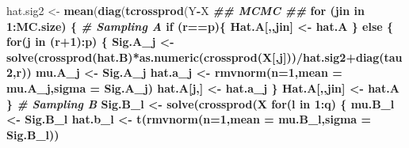 \documentclass[]{book}
\newenvironment{Shaded}{\begin{snugshade}}{\end{snugshade}}
\newcommand{\CommentTok}[1]{\textcolor[rgb]{0.56,0.35,0.01}{\textit{#1}}}
\newcommand{\ControlFlowTok}[1]{\textcolor[rgb]{0.13,0.29,0.53}{\textbf{#1}}}
\newcommand{\DataTypeTok}[1]{\textcolor[rgb]{0.13,0.29,0.53}{#1}}
\newcommand{\DecValTok}[1]{\textcolor[rgb]{0.00,0.00,0.81}{#1}}
\newcommand{\KeywordTok}[1]{\textcolor[rgb]{0.13,0.29,0.53}{\textbf{#1}}}
\newcommand{\NormalTok}[1]{#1}
\newcommand{\OperatorTok}[1]{\textcolor[rgb]{0.81,0.36,0.00}{\textbf{#1}}}
\newcommand{\StringTok}[1]{\textcolor[rgb]{0.31,0.60,0.02}{#1}}
\begin{document}
\begin{Shaded}
\begin{Highlighting}[]
{{\NormalTok{    hat.sig2 <-}\StringTok{ }\KeywordTok{mean}\NormalTok{(}\KeywordTok{diag}\NormalTok{(}\KeywordTok{tcrossprod}\NormalTok{(Y}\OperatorTok{-}\NormalTok{X}\OperatorTok{%*%}\NormalTok{hat.A}\OperatorTok{%*%}\KeywordTok{t}\NormalTok{(hat.B))))  }\CommentTok{#true.sig2}
    \CommentTok{## MCMC ##}
    \ControlFlowTok{for}\NormalTok{ (jin }\ControlFlowTok{in} \DecValTok{1}\OperatorTok{:}\NormalTok{MC.size) \{}
      \CommentTok{# Sampling A}
      \ControlFlowTok{if}\NormalTok{ (r}\OperatorTok{==}\NormalTok{p)\{}
\NormalTok{        Hat.A[,,jin] <-}\StringTok{ }\NormalTok{hat.A}
\NormalTok{      \} }\ControlFlowTok{else}\NormalTok{ \{}
        \ControlFlowTok{for}\NormalTok{(j }\ControlFlowTok{in}\NormalTok{ (r}\OperatorTok{+}\DecValTok{1}\NormalTok{)}\OperatorTok{:}\NormalTok{p) \{}
\NormalTok{          Sig.A_j <-}\StringTok{ }\KeywordTok{solve}\NormalTok{(}\KeywordTok{crossprod}\NormalTok{(hat.B)}\OperatorTok{*}\KeywordTok{as.numeric}\NormalTok{(}\KeywordTok{crossprod}\NormalTok{(X[,j]))}\OperatorTok{/}\NormalTok{hat.sig2}\OperatorTok{+}\KeywordTok{diag}\NormalTok{(tau2,r))}
\NormalTok{          mu.A_j <-}\StringTok{ }\NormalTok{Sig.A_j}\OperatorTok{%*%}\KeywordTok{t}\NormalTok{(hat.B)}\OperatorTok{%*%}\KeywordTok{t}\NormalTok{(Y}\OperatorTok{-}\NormalTok{X[,}\OperatorTok{-}\NormalTok{j]}\OperatorTok{%*%}\NormalTok{hat.A[}\OperatorTok{-}\NormalTok{j,]}\OperatorTok{%*%}\KeywordTok{t}\NormalTok{(hat.B))}\OperatorTok{%*%}\NormalTok{X[,j]}\OperatorTok{/}\NormalTok{hat.sig2}
\NormalTok{          hat.a_j <-}\StringTok{ }\KeywordTok{rmvnorm}\NormalTok{(}\DataTypeTok{n=}\DecValTok{1}\NormalTok{,}\DataTypeTok{mean =}\NormalTok{ mu.A_j,}\DataTypeTok{sigma =}\NormalTok{ Sig.A_j)}
\NormalTok{          hat.A[j,] <-}\StringTok{ }\NormalTok{hat.a_j}
\NormalTok{        \}}
\NormalTok{        Hat.A[,,jin] <-}\StringTok{ }\NormalTok{hat.A}
\NormalTok{      \}}
      \CommentTok{# Sampling B}
\NormalTok{      Sig.B_l <-}\StringTok{ }\KeywordTok{solve}\NormalTok{(}\KeywordTok{crossprod}\NormalTok{(X}\OperatorTok{%*%}\NormalTok{hat.A)}\OperatorTok{/}\NormalTok{hat.sig2}\OperatorTok{+}\KeywordTok{diag}\NormalTok{(tau2,r))}
      \ControlFlowTok{for}\NormalTok{(l }\ControlFlowTok{in} \DecValTok{1}\OperatorTok{:}\NormalTok{q) \{}
\NormalTok{        mu.B_l <-}\StringTok{ }\NormalTok{Sig.B_l}\OperatorTok{%*%}\KeywordTok{t}\NormalTok{(X}\OperatorTok{%*%}\NormalTok{hat.A)}\OperatorTok{%*%}\NormalTok{Y[,l]}\OperatorTok{/}\NormalTok{hat.sig2}
\NormalTok{        hat.b_l <-}\StringTok{ }\KeywordTok{t}\NormalTok{(}\KeywordTok{rmvnorm}\NormalTok{(}\DataTypeTok{n=}\DecValTok{1}\NormalTok{,}\DataTypeTok{mean =}\NormalTok{ mu.B_l,}\DataTypeTok{sigma =}\NormalTok{ Sig.B_l))}
}}}}}}
\end{Highlighting}
\end{Shaded}
\end{document}
